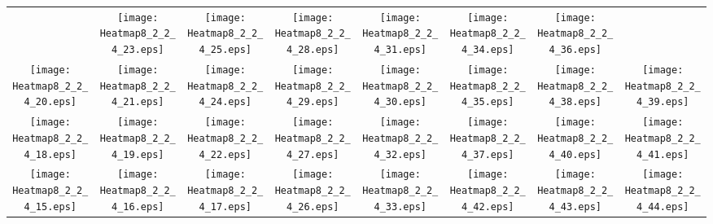 \documentclass{standalone}
\begin{document}
\renewcommand{\arraystretch}{0}
\setlength{\tabcolsep}{0pt}
\begin{tabular}{ *8{c} }
 & \texttt{[image: Heatmap8\_2\_2\_4\_23.eps]} & \texttt{[image: Heatmap8\_2\_2\_4\_25.eps]} & \texttt{[image: Heatmap8\_2\_2\_4\_28.eps]} & \texttt{[image: Heatmap8\_2\_2\_4\_31.eps]} & \texttt{[image: Heatmap8\_2\_2\_4\_34.eps]} & \texttt{[image: Heatmap8\_2\_2\_4\_36.eps]} &  \\
\texttt{[image: Heatmap8\_2\_2\_4\_20.eps]} & \texttt{[image: Heatmap8\_2\_2\_4\_21.eps]} & \texttt{[image: Heatmap8\_2\_2\_4\_24.eps]} & \texttt{[image: Heatmap8\_2\_2\_4\_29.eps]} & \texttt{[image: Heatmap8\_2\_2\_4\_30.eps]} & \texttt{[image: Heatmap8\_2\_2\_4\_35.eps]} & \texttt{[image: Heatmap8\_2\_2\_4\_38.eps]} & \texttt{[image: Heatmap8\_2\_2\_4\_39.eps]} \\
\texttt{[image: Heatmap8\_2\_2\_4\_18.eps]} & \texttt{[image: Heatmap8\_2\_2\_4\_19.eps]} & \texttt{[image: Heatmap8\_2\_2\_4\_22.eps]} & \texttt{[image: Heatmap8\_2\_2\_4\_27.eps]} & \texttt{[image: Heatmap8\_2\_2\_4\_32.eps]} & \texttt{[image: Heatmap8\_2\_2\_4\_37.eps]} & \texttt{[image: Heatmap8\_2\_2\_4\_40.eps]} & \texttt{[image: Heatmap8\_2\_2\_4\_41.eps]} \\
\texttt{[image: Heatmap8\_2\_2\_4\_15.eps]} & \texttt{[image: Heatmap8\_2\_2\_4\_16.eps]} & \texttt{[image: Heatmap8\_2\_2\_4\_17.eps]} & \texttt{[image: Heatmap8\_2\_2\_4\_26.eps]} & \texttt{[image: Heatmap8\_2\_2\_4\_33.eps]} & \texttt{[image: Heatmap8\_2\_2\_4\_42.eps]} & \texttt{[image: Heatmap8\_2\_2\_4\_43.eps]} & \texttt{[image: Heatmap8\_2\_2\_4\_44.eps]} \\

\end{tabular}
\end{document}
